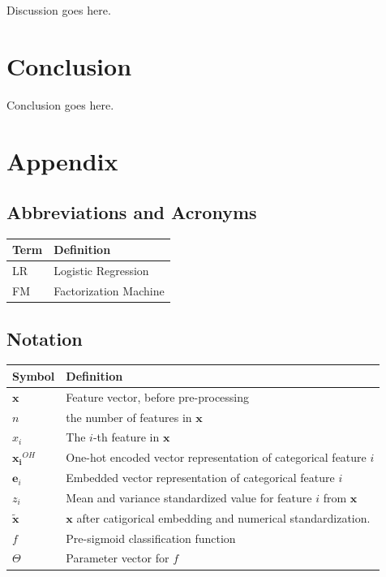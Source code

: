\documentclass{mldsmsc}
\begin{document}
Discussion goes here.

\chapter{Conclusion}


Conclusion goes here. 





\clearpage
\renewcommand*{\thepage}{A\arabic{page}}

\appendix
%
\chapter{Appendix}

\section{Abbreviations and Acronyms}
\label{app:acronyms}

\begin{table}[ht]
    \begin{tabular}{|l|l|}
      \hline
        \textbf{Term} & \textbf{Definition} \\
      \hline
        LR& Logistic Regression\\
        FM & Factorization Machine\\ 
    \hline
    \end{tabular}
\end{table}


\section{Notation}
\label{app:notation}

\begin{table}[ht]
    \begin{tabular}{|l|l|}
      \hline
        \textbf{Symbol} & \textbf{Definition} \\
      \hline
        $\mathbf{x}$& Feature vector, before pre-processing\\
        $n$ & the number of features in $\mathbf{x}$\\
        $x_i$& The $i$-th feature in $\mathbf{x}$\\
        $\mathbf{x_i}^{OH}$ & One-hot encoded vector representation of categorical feature $i$\\
        $\mathbf{e}_i$ & Embedded vector representation of categorical feature $i$ \\
        $z_i$ & Mean and variance standardized value for feature $i$ from $\mathbf{x}$\\
        $\tilde{\mathbf{x}}$ & $\mathbf{x}$ after catigorical embedding and numerical standardization.\\
        $f$ & Pre-sigmoid classification function\\
        $\Theta$ & Parameter vector for $f$ \\
    \hline
    \end{tabular}
\end{table}




\end{document}

